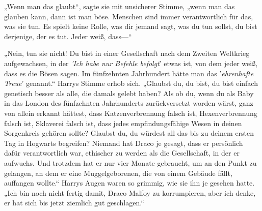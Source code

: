 „Wenn man das glaubt“, sagte sie mit unsicherer Stimme, „wenn man das glauben kann, dann ist man böse. Menschen sind immer verantwortlich für das, was sie tun. Es spielt keine Rolle, was dir jemand sagt, was du tun sollst, du bist derjenige, der es tut. Jeder weiß, dass—“

„Nein, tun sie nicht! Du bist in einer Gesellschaft nach dem Zweiten Weltkrieg aufgewachsen, in der \emph{'Ich habe nur Befehle befolgt}' etwas ist, von dem jeder weiß, dass es die Bösen sagen. Im fünfzehnten Jahrhundert hätte man das '\emph{ehrenhafte Treue}' genannt.“
Harrys Stimme erhob sich.
„Glaubst du, du bist, du bist einfach genetisch besser als alle, die damals gelebt haben? Als ob du, wenn du als Baby in das London des fünfzehnten Jahrhunderts zurückversetzt worden wärst, ganz von allein erkannt hättest, dass Katzenverbrennung falsch ist, Hexenverbrennung falsch ist, Sklaverei falsch ist, dass jedes empfindungsfähige Wesen in deinen Sorgenkreis gehören sollte? Glaubst du, du würdest all das bis zu deinem ersten Tag in Hogwarts begreifen? Niemand hat Draco je gesagt, dass er persönlich dafür verantwortlich war, ethischer zu werden als die Gesellschaft, in der er aufwuchs. Und trotzdem hat er nur vier Monate gebraucht, um an den Punkt zu gelangen, an dem er eine Muggelgeborenen, die von einem Gebäude fällt, auffangen wollte.“
Harrys Augen waren so grimmig, wie sie ihn je gesehen hatte.
„Ich bin noch nicht fertig damit, Draco Malfoy zu korrumpieren, aber ich denke, er hat sich bis jetzt ziemlich gut geschlagen.“

